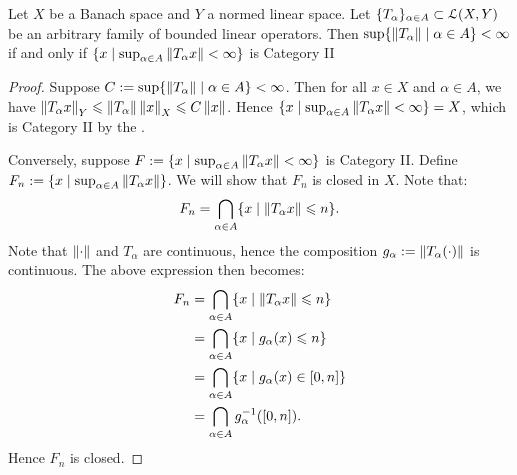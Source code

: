 \begin{theorem}\label{thm:banach-steinhouse}
    Let $X$ be a Banach space and $Y$ a normed linear space. Let $\{T_\alpha\}_{\alpha \in A} \subset \mathcal{L}(X,Y)$ be an arbitrary family of bounded linear operators. Then $\sup\{ \left\lVert T_\alpha \right\rVert \mid \alpha \in A\} < \infty$ if and only if $\{x \mid \sup_{\alpha \in A}\left\lVert T_\alpha x \right\rVert <\infty \}$ is Category II
\end{theorem}
    \begin{proof}
        Suppose $C := \sup\{ \left\lVert T_\alpha \right\rVert \mid \alpha \in A\} < \infty$. Then for all $x \in X$ and $\alpha \in A$, we have $\left\lVert T_\alpha x \right\rVert_Y \leqslant \left\lVert T_\alpha \right\rVert \left\lVert x \right\rVert_X \leqslant C \left\lVert x \right\rVert$. Hence $\{x \mid \sup_{\alpha \in A}\left\lVert T_\alpha x \right\rVert <\infty \} = X$, which is Category II by the .

        Conversely, suppose $F:= \{x \mid \sup_{\alpha \in A}\left\lVert T_\alpha x \right\rVert <\infty \}$ is Category II. Define $F_n := \{x \mid \sup_{\alpha \in A}\left\lVert T_\alpha x \right\rVert \}$. We will show that $F_n$ is closed in $X$. Note that:
            \begin{equation*}
            \begin{split}
                F_n = \bigcap_{\alpha \in A}\{x \mid \left\lVert T_\alpha x \right\rVert \leqslant n\}.
            \end{split}
            \end{equation*}
        Note that $\left\lVert \cdot \right\rVert$ and $T_\alpha$ are continuous, hence the composition $g_\alpha := \left\lVert T_\alpha (\cdot) \right\rVert$ is continuous. The above expression then becomes:
            \begin{equation*}
            \begin{split}
                F_n 
                & = \bigcap_{\alpha \in A}\{x \mid \left\lVert T_\alpha x \right\rVert \leqslant n\} \\
                & = \bigcap_{\alpha \in A}\{x \mid g_\alpha(x) \leqslant n\} \\
                & = \bigcap_{\alpha \in A}\{x \mid g_\alpha(x) \in [0,n]\} \\
                & = \bigcap_{\alpha \in A}g_\alpha^{-1}([0,n]).
            \end{split}
            \end{equation*}
        Hence $F_n$ is closed.
         

\end{proof}
